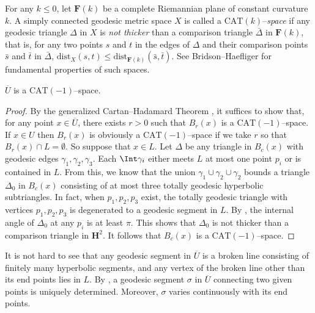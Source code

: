 \documentclass{gtart_a}
\theoremstyle{definition}
\numberwithin{equation}{section}
\begin{document}
For any $k\leq 0$, let $\mathbf{F}(k)$ be a complete Riemannian plane of constant curvature $k$.
A simply connected geodesic metric space $X$ is called a $\mathrm{CAT}(k)$--\emph{space\/} if any geodesic triangle 
$\Delta$ in $X$ is \emph{not thicker\/} than a comparison triangle $\bar \Delta$ in $\mathbf{F}(k)$, that is, for 
any two points $s$ and $t$ in the edges of $\Delta$ and their comparison points $\bar s$ and $\bar t$ in $\bar\Delta$, 
$\mathrm{dist}_X(s,t)\leq \mathrm{dist}_{\mathbf{F}(k)}(\bar s,\bar t)$.
See Bridson--Haefliger \cite{bh} for fundamental properties of such spaces.



\begin{lemma}\label{CAT}
$\overline{U}$ is a $\mathrm{CAT}(-1)$--space.
\end{lemma}
\begin{proof}
By the generalized Cartan--Hadamard Theorem \cite[Chapter II.4, Theorem 4.1(2)]{bh}, it suffices to show that, 
for any point $x\in \overline{U}$, there exists $r>0$ such that $B_r(x)$ is a $\mathrm{CAT}(-1)$--space.
If $x\in U$ then $B_r(x)$ is obviously a $\mathrm{CAT}(-1)$--space if we take $r$ so that $B_r(x)\cap L=\emptyset$.
So suppose that $x\in L$.
Let $\Delta$ be any triangle in $B_c(x)$ with geodesic edges $\gamma_1,\gamma_2,\gamma_3$.
Each $\Int \gamma_i$ either meets $L$ at most one point $p_i$ or is contained in $L$.
From this, we know that the union $\gamma_1\cup \gamma_2\cup \gamma_2$ bounds a triangle $\Delta_0$ in $B_c(x)$ 
consisting of at most three totally geodesic hyperbolic subtriangles.
In fact, when $p_1,p_2,p_3$ exist, the totally geodesic triangle with vertices $p_1,p_2,p_3$ is degenerated to 
a geodesic segment in $L$.
By , the internal angle of $\Delta_0$ at any $p_i$ is at least $\pi$.
This shows that $\Delta_0$ is not thicker than a comparison triangle in $\mathbf{H}^2$.
It follows that $B_c(x)$ is a $\mathrm{CAT}(-1)$--space.
\end{proof}




It is not hard to see that any geodesic segment in $\overline U$ is a broken line consisting of finitely 
many hyperbolic segments, and any vertex of the broken line other than its end points lies in $L$.
By , a geodesic segment $\sigma$ in $\overline U$ connecting two given points is uniquely 
determined.
Moreover, $\sigma$ varies continuously with its end points.
\end{document}
